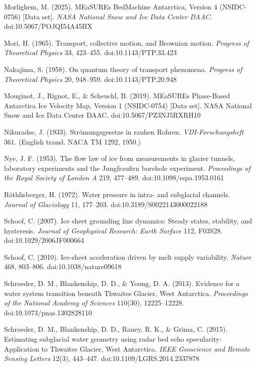\documentclass[tc, manuscript]{copernicus}
\begin{document}
\begin{thebibliography}{}
Morlighem, M. (2025). MEaSUREs BedMachine Antarctica, Version 4 (NSIDC-0756) [Data set]. \emph{NASA National Snow and Ice Data Center DAAC.} doi:10.5067/POJQI54A45HX

Mori, H. (1965). Transport, collective motion, and Brownian motion. \emph{Progress of Theoretical Physics} 33, 423–455. doi:10.1143/PTP.33.423

Nakajima, S. (1958). On quantum theory of transport phenomena. \emph{Progress of Theoretical Physics} 20, 948–959. doi:10.1143/PTP.20.948

Mouginot, J., Rignot, E., \& Scheuchl, B. (2019). MEaSUREs Phase-Based Antarctica Ice Velocity Map, Version 1 (NSIDC-0754) [Data set]. NASA National Snow and Ice Data Center DAAC. doi:10.5067/PZ3NJ5RXRH10

Nikuradse, J. (1933). Strömungsgesetze in rauhen Rohren. \emph{VDI-Forschungsheft} 361. (English transl. NACA TM 1292, 1950.)

Nye, J. F. (1953). The flow law of ice from measurements in glacier tunnels, laboratory experiments and the Jungfraufirn borehole experiment. \emph{Proceedings of the Royal Society of London A} 219, 477–489. doi:10.1098/rspa.1953.0161

Röthlisberger, H. (1972). Water pressure in intra- and subglacial channels. \emph{Journal of Glaciology} 11, 177–203. doi:10.3189/S0022143000022188

Schoof, C. (2007). Ice sheet grounding line dynamics: Steady states, stability, and hysteresis. \emph{Journal of Geophysical Research: Earth Surface} 112, F03S28. doi:10.1029/2006JF000664

Schoof, C. (2010). Ice-sheet acceleration driven by melt supply variability. \emph{Nature} 468, 803–806. doi:10.1038/nature09618

Schroeder, D. M., Blankenship, D. D., \& Young, D. A. (2013). Evidence for a water system transition beneath Thwaites Glacier, West Antarctica. \emph{Proceedings of the National Academy of Sciences} 110(30), 12225–12228. doi:10.1073/pnas.1302828110

Schroeder, D. M., Blankenship, D. D., Raney, R. K., \& Grima, C. (2015). Estimating subglacial water geometry using radar bed echo specularity: Application to Thwaites Glacier, West Antarctica. \emph{IEEE Geoscience and Remote Sensing Letters} 12(3), 443–447. doi:10.1109/LGRS.2014.2337878


\end{thebibliography}
\end{document}
